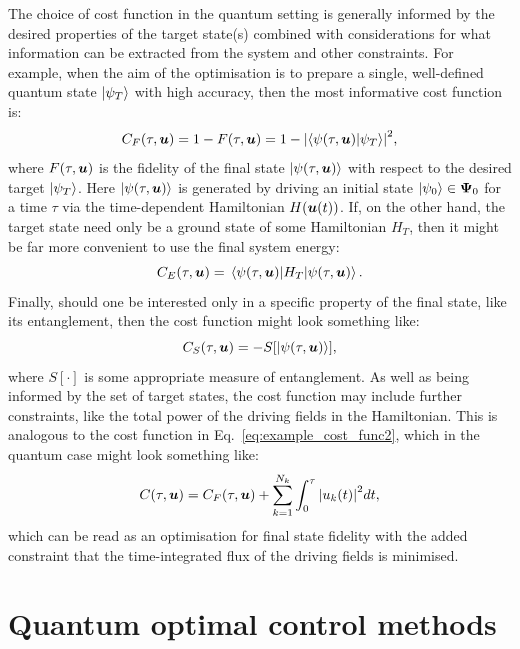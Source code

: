 The choice of cost function in the quantum setting is generally informed by the desired properties of the target state(s) combined with considerations for what information can be extracted from the system and other constraints. For example, when the aim of the optimisation is to prepare a single, well-defined quantum state $\ket{\psi_T}$ with high accuracy, then the most informative cost function is:
\begin{equation}\label{eq:costfunc_fidelity}
    C_F(\tau, \boldsymbol{u}) = 1 - F(\tau, \boldsymbol{u}) = 1 - \abs{\braket{\psi(\tau, \boldsymbol{u})}{\psi_T}}^2,
\end{equation}
where $F(\tau, \boldsymbol{u})$ is the fidelity of the final state $\ket{\psi(\tau, \boldsymbol{u})}$ with respect to the desired target $\ket{\psi_T}$. Here $\ket{\psi(\tau, \boldsymbol{u})}$ is generated by driving an initial state $\ket{\psi_0} \in \boldsymbol \Psi_0$ for a time $\tau$ via the time-dependent Hamiltonian $H(\boldsymbol{u}(t))$. If, on the other hand, the target state need only be a ground state of some Hamiltonian $H_T$, then it might be far more convenient to use the final system energy:
\begin{equation}\label{eq:costfunc_energy}
    C_E(\tau, \boldsymbol{u}) = \mel{\psi(\tau, \boldsymbol{u})}{H_T}{\psi(\tau, \boldsymbol{u})}.
\end{equation}
Finally, should one be interested only in a specific property of the final state, like its entanglement, then the cost function might look something like:
\begin{equation}\label{eq:costfunc_entanglement}
    C_S(\tau, \boldsymbol{u}) = -S[\ket{\psi(\tau, \boldsymbol{u})}],
\end{equation}
where $S[\cdot]$ is some appropriate measure of entanglement. As well as being informed by the set of target states, the cost function may include further constraints, like the total power of the driving fields in the Hamiltonian. This is analogous to the cost function in Eq.~\eqref{eq:example_cost_func2}, which in the quantum case might look something like:
\begin{equation}\label{eq:costfunc_constraint}
    C(\tau, \boldsymbol{u}) = C_F(\tau, \boldsymbol{u}) + \sum_{k = 1}^{N_k} \int_0^{\tau} \abs{u_k(t)}^2 dt,
\end{equation}
which can be read as an optimisation for final state fidelity with the added constraint that the time-integrated flux of the driving fields is minimised. 

\section{Quantum optimal control methods}\label{sec:3.3_qoct_methods}

